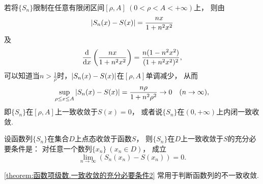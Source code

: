 \begin{example}
若将\(\{S_n\}\)限制在任意有限闭区间\([\rho,A]\ (0<\rho<A<+\infty)\)上，
则由\begin{equation*}
	\abs{S_n(x) - S(x)} = \frac{nx}{1+n^2x^2}
\end{equation*}及\begin{equation*}
	\dv{x} \left(\frac{nx}{1+n^2x^2}\right)
	= \frac{n(1-n^2x^2)}{(1+n^2x^2)^2},
\end{equation*}
可以知道当\(n>\frac1\rho\)时，\(\abs{S_n(x) - S(x)}\)在\([\rho,A]\)单调减少，
从而\begin{equation*}
	\sup_{\rho \leq x \leq A} \abs{S_n(x) - S(x)}
	= \frac{n\rho}{1+n^2\rho^2}
	\to 0
	\quad(n\to\infty),
\end{equation*}
即\(\{S_n\}\)在\([\rho,A]\)上一致收敛于\(S(x)=0\)，
或者说\(\{S_n\}\)在\((0,+\infty)\)上内闭一致收敛.
\end{example}

\begin{theorem}\label{theorem:函数项级数.一致收敛的充分必要条件2}
设函数列\(\{S_n\}\)在集合\(D\)上点态收敛于函数\(S\)，
则\(\{S_n\}\)在\(D\)上一致收敛于\(S\)的充分必要条件是：
对任意一个数列\(\{x_n\}\ (x_n \in D)\)，
成立\begin{equation*}
	\lim_{n\to\infty} (S_n(x_n) - S(x_n)) = 0.
\end{equation*}
\end{theorem}
\cref{theorem:函数项级数.一致收敛的充分必要条件2}
常用于判断函数列的不一致收敛.

